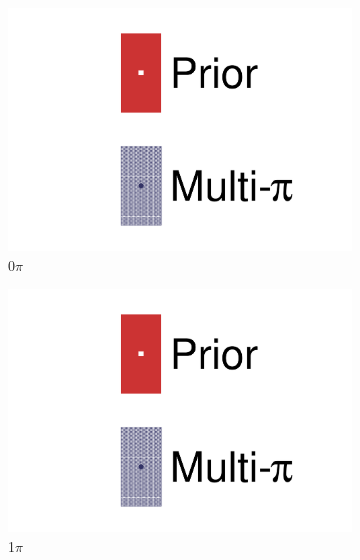 \begin{figure}[h]
	\begin{subfigure}[t]{0.32\textwidth}
		\includegraphics[width=\textwidth,page=52, trim={0mm 0mm 0mm 0mm}, clip]{figures/mach3/2018/data/2018a_FixedCov_RedCov_Mpi_Data_merge_drawPar_withDet}
		\caption{0$\pi$}
	\end{subfigure}
	\begin{subfigure}[t]{0.32\textwidth}
		\includegraphics[width=\textwidth,page=53, trim={0mm 0mm 0mm 0mm}, clip]{figures/mach3/2018/data/2018a_FixedCov_RedCov_Mpi_Data_merge_drawPar_withDet}
		\caption{1$\pi$}
	\end{subfigure}
	\begin{subfigure}[t]{0.32\textwidth}

\end{subfigure}
\end{figure}
